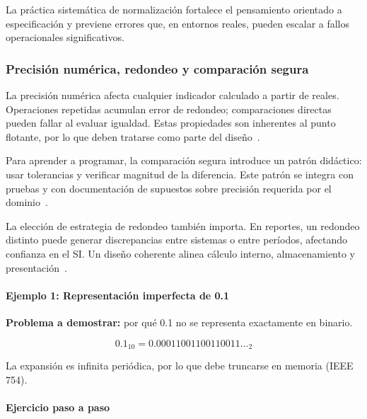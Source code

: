 \documentclass[12pt,twoside]{book}
\begin{document}
						La práctica sistemática de normalización fortalece el pensamiento orientado a especificación y previene errores que, en entornos reales, pueden escalar a fallos operacionales significativos.
						
					\subsubsection{Precisión numérica, redondeo y comparación segura}
					\noindent
						La precisión numérica afecta cualquier indicador calculado a partir de reales. Operaciones repetidas acumulan error de redondeo; comparaciones directas pueden fallar al evaluar igualdad. Estas propiedades son inherentes al punto flotante, por lo que deben tratarse como parte del diseño~\cite{Goldberg1991What,IEEE2019Standard754,Chapra2014Numerical}.
						
						Para aprender a programar, la comparación segura introduce un patrón didáctico: usar tolerancias y verificar magnitud de la diferencia. Este patrón se integra con pruebas y con documentación de supuestos sobre precisión requerida por el dominio~\cite{Hanly2015Problem,Ghezzi2003Fundamentals,Goldberg1991What}.
						
						La elección de estrategia de redondeo también importa. En reportes, un redondeo distinto puede generar discrepancias entre sistemas o entre períodos, afectando confianza en el SI. Un diseño coherente alinea cálculo interno, almacenamiento y presentación~\cite{Laudon2020Management,Date2019Database,IEEE2019Standard754}.
						
						\paragraph{Ejemplo 1: Representación imperfecta de 0.1}
						
						\noindent
						\textbf{Problema a demostrar:} por qué 0.1 no se representa exactamente en binario.
						
						\[
						0.1_{10} = 0.00011001100110011\ldots_2
						\]
						
						La expansión es infinita periódica, por lo que debe truncarse en memoria (IEEE 754).  
						
						\paragraph{Ejercicio paso a paso}
						
\end{document}
